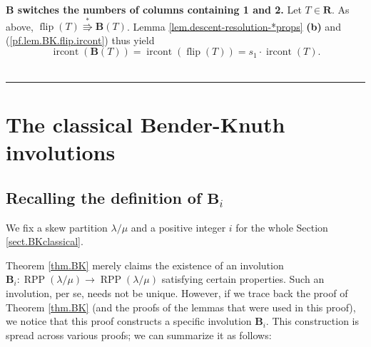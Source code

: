 \documentclass[numbers=enddot,12pt,final,onecolumn,notitlepage]{scrartcl}%
\theoremstyle{definition}
\newenvironment{proof}[1][Proof]{\noindent\textbf{#1.} }{\ \rule{0.5em}{0.5em}}
\begin{document}
\begin{proof}[$\mathbf{B}$ switches the numbers of columns containing 1 and 2]
Let $T\in\mathbf{R}$. As above, $\operatorname*{flip}\left(  T\right)  \overset{\ast
}{\Rrightarrow}\mathbf{B}\left(  T\right)  $. Lemma \ref{lem.descent-resolution-*props} \textbf{(b)}
and (\ref{pf.lem.BK.flip.ircont}) thus yield
\[
\operatorname*{ircont}\left(  \mathbf{B}\left(  T\right)  \right)
=\operatorname*{ircont}\left(  \operatorname*{flip}\left(  T\right)  \right)
=s_{1}\cdot\operatorname*{ircont}\left(  T\right).
\]
\end{proof}

\section{\label{sect.BKclassical}The classical Bender-Knuth involutions}

\subsection{Recalling the definition of $\mathbf{B}_{i}$}

We fix a skew partition $\lambda/\mu$ and a positive integer $i$ for the whole
Section \ref{sect.BKclassical}.

Theorem \ref{thm.BK} merely claims the existence of an involution
$\mathbf{B}_{i}:\operatorname*{RPP}\left(  \lambda/\mu\right)  \rightarrow
\operatorname*{RPP}\left(  \lambda/\mu\right)  $ satisfying certain
properties. Such an involution, per se, needs not be unique. However, if we
trace back the proof of Theorem \ref{thm.BK} (and the proofs of the lemmas
that were used in this proof), we notice that this proof constructs a specific
involution $\mathbf{B}_{i}$. This construction is spread across various
proofs; we can summarize it as follows:
\end{document}
